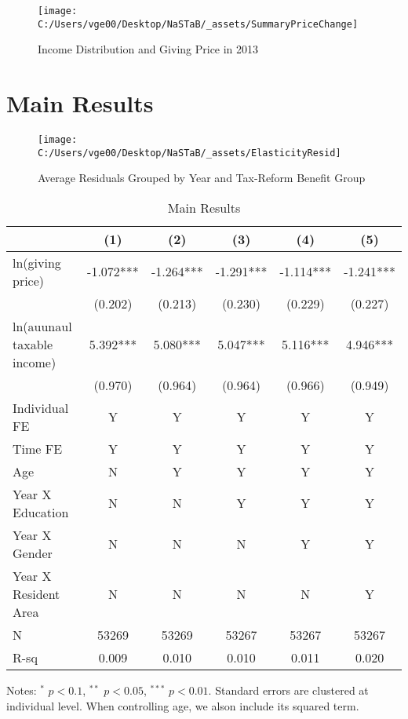 \documentclass[ review  , 3p ]{elsarticle}
\begin{document}
  \begin{figure}
  
  {\centering \texttt{[image: C:/Users/vge00/Desktop/NaSTaB/\_assets/SummaryPriceChange]} 
  
  }
  
  \caption{Income Distribution and Giving Price in 2013}\label{fig:unnamed-chunk-2}
  \end{figure}
  
  \hypertarget{main-results}{%
  \section{Main Results}\label{main-results}}
  
  \begin{figure}
  
  {\centering \texttt{[image: C:/Users/vge00/Desktop/NaSTaB/\_assets/ElasticityResid]} 
  
  }
  
  \caption{Average Residuals Grouped by Year and Tax-Reform Benefit Group}\label{fig:unnamed-chunk-3}
  \end{figure}
  
  \begin{table}
  
  \caption{\label{tab:kableEstimateElasticityPart1}Main Results}
  \centering
  \fontsize{8}{10}\selectfont
  \begin{threeparttable}
  \begin{tabular}[t]{lccccc}
  \toprule
   & (1) & (2) & (3) & (4) & (5)\\
  \midrule
  ln(giving price) & -1.072*** & -1.264*** & -1.291*** & -1.114*** & -1.241***\\
   & (0.202) & (0.213) & (0.230) & (0.229) & (0.227)\\
  ln(auunaul taxable income) & 5.392*** & 5.080*** & 5.047*** & 5.116*** & 4.946***\\
   & (0.970) & (0.964) & (0.964) & (0.966) & (0.949)\\
  Individual FE & Y & Y & Y & Y & Y\\
  Time FE & Y & Y & Y & Y & Y\\
  Age & N & Y & Y & Y & Y\\
  Year X Education & N & N & Y & Y & Y\\
  Year X Gender & N & N & N & Y & Y\\
  Year X Resident Area & N & N & N & N & Y\\
  N & 53269 & 53269 & 53267 & 53267 & 53267\\
  R-sq & 0.009 & 0.010 & 0.010 & 0.011 & 0.020\\
  \bottomrule
  \end{tabular}
  \begin{tablenotes}
  \item Notes: $^{*}$ $p < 0.1$, $^{**}$ $p < 0.05$, $^{***}$ $p < 0.01$. Standard errors are clustered at individual level. When controlling age, we alson include its squared term.
  \end{tablenotes}
  \end{threeparttable}
  \end{table}
  
\end{document}
